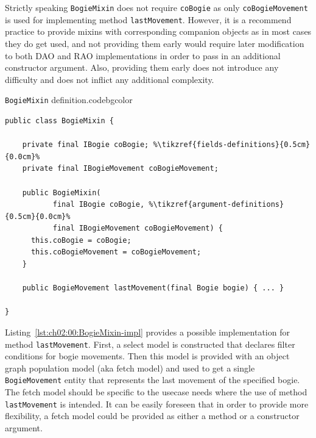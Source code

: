   Strictly speaking \texttt{BogieMixin} does not require \texttt{coBogie} as only \texttt{coBogieMovement} is used for implementing method \texttt{lastMovement}.
  However, it is a recommend practice to provide mixins with corresponding companion objects as in most cases they do get used, and not providing them early would require later modification to both DAO and RAO implementations in order to pass in an additional constructor argument.
  Also, providing them early does not introduce any difficulty and does not inflict any additional complexity.
  
    \begin{code}{\texttt{BogieMixin} definition.}{\label{lst:ch02:00:BogieMixin-def}}{codebgcolor}
    \begin{lstlisting}
public class BogieMixin {

    private final IBogie coBogie; %\tikzref{fields-definitions}{0.5cm}{0.0cm}%
    private final IBogieMovement coBogieMovement; 

    public BogieMixin(
           final IBogie coBogie, %\tikzref{argument-definitions}{0.5cm}{0.0cm}%
           final IBogieMovement coBogieMovement) {
      this.coBogie = coBogie;
      this.coBogieMovement = coBogieMovement;
    }
    
    public BogieMovement lastMovement(final Bogie bogie) { ... }
    
}
    \end{lstlisting}
    \vspace*{-7px}
  \end{code}
  
  Listing~\ref{lst:ch02:00:BogieMixin-impl} provides a possible implementation for method \texttt{lastMovement}.
  First, a select model is constructed that declares filter conditions for bogie movements.
  Then this model is provided with an object graph population model (aka fetch model) and used to get a single \texttt{BogieMovement} entity that represents the last movement of the specified bogie.
  The fetch model should be specific to the usecase needs where the use of method \texttt{lastMovement} is intended.
  It can be easily foreseen that in order to provide more flexibility, a fetch model could be provided as either a method or a constructor argument.
  
